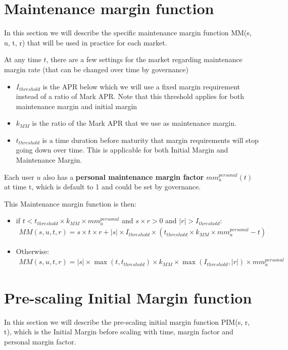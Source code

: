 \documentclass{article}%
\begin{document}
\begin{appendices}
\section{Maintenance margin function}
In this section we will describe the specific maintenance margin function MM(s, u, t, r) that will be used in practice for each market.

At any time $t$, there are a few settings for the market regarding maintenance margin rate (that can be changed over time by governance)
\begin{itemize}
    \item $I_{threshold}$ is the APR below which we will use a fixed margin requirement instead of a ratio of Mark APR. Note that this threshold applies for both maintenance margin and initial margin
    \item $k_{MM}$ is the ratio of the Mark APR that we use as maintenance margin.
    \item $t_{threshold}$ is a time duration before maturity that margin requirements will stop going down over time. This is applicable for both Initial Margin and Maintenance Margin.
\end{itemize}

Each user $u$ also has a \textbf{personal maintenance margin factor} $mm_{u}^{personal}(t)$ at time t, which is default to 1 and could be set by governance.

This Maintenance margin function is then:
\begin{itemize}
    \item if $t<t_{threshold}\times k_{MM} \times mm_u^{personal}$ and $s \times r > 0$ and $|r| > I_{threshold}$:
    \begin{align}
        MM(s, u, t, r) = s \times t \times r + |s| \times I_{threshold} \times (t_{threshold} \times k_{MM} \times mm_u^{personal} - t)
    \end{align}
    \item Otherwise:
    \begin{align}
        MM(s, u, t, r) = |s| \times \max(t, t_{threshold}) \times k_{MM} \times \max(I_{threshold}, |r|) \times mm_{u}^{personal}
    \end{align}
\end{itemize}

\section{Pre-scaling Initial Margin function}
In this section we will describe the pre-scaling initial margin function PIM(s, r, t), which is the Initial Margin before scaling with time, margin factor and personal margin factor.


\end{appendices}
\end{document}
